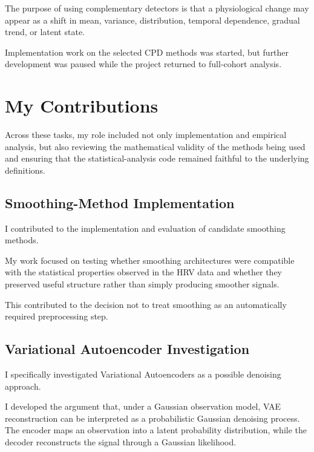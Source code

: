 \documentclass[11pt,a4paper]{article}
\begin{document}
The purpose of using complementary detectors is that a physiological change
may appear as a shift in mean, variance, distribution, temporal dependence,
gradual trend, or latent state.

Implementation work on the selected CPD methods was started, but further
development was paused while the project returned to full-cohort analysis.

\section{My Contributions}
Across these tasks, my role included not only implementation and empirical analysis, but also reviewing the mathematical validity of the methods being used and ensuring that the statistical-analysis code remained faithful to the underlying definitions.
\subsection{Smoothing-Method Implementation}

I contributed to the implementation and evaluation of candidate smoothing
methods.

My work focused on testing whether smoothing architectures were compatible
with the statistical properties observed in the HRV data and whether they
preserved useful structure rather than simply producing smoother signals.

This contributed to the decision not to treat smoothing as an automatically
required preprocessing step.

\subsection{Variational Autoencoder Investigation}

I specifically investigated Variational Autoencoders as a possible denoising
approach.

I developed the argument that, under a Gaussian observation model, VAE
reconstruction can be interpreted as a probabilistic Gaussian denoising
process. The encoder maps an observation into a latent probability
distribution, while the decoder reconstructs the signal through a Gaussian
likelihood.
\end{document}
